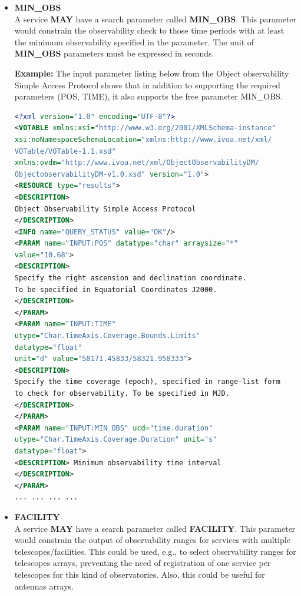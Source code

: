 \documentclass[11pt,a4paper]{ivoatex/ivoa}
\begin{document}
\begin{itemize}
\item{\textbf{MIN\_OBS}\\A service \textbf{MAY} have a search parameter
called \textbf{MIN\_OBS}. This parameter would constrain the observability
check to those time periods with at least the minimum observability specified
in the parameter. The unit of \textbf{MIN\_OBS} parameters must be expressed
in seconds.\par
\textbf{Example:} The input parameter listing below from the Object
observability Simple Access Protocol shows that in addition to supporting
the required parameters (POS, TIME), it also supports the free
parameter MIN\_OBS.
\begin{lstlisting}[language=XML]
<?xml version="1.0" encoding="UTF-8"?>
<VOTABLE xmlns:xsi="http://www.w3.org/2001/XMLSchema-instance"
xsi:noNamespaceSchemaLocation="xmlns:http://www.ivoa.net/xml/
VOTable/VOTable-1.1.xsd"
xmlns:ovdm="http://www.ivoa.net/xml/ObjectObservabilityDM/
ObjectobservabilityDM-v1.0.xsd" version="1.0">
<RESOURCE type="results">
<DESCRIPTION>
Object Observability Simple Access Protocol
</DESCRIPTION>
<INFO name="QUERY_STATUS" value="OK"/>
<PARAM name="INPUT:POS" datatype="char" arraysize="*"
value="10.68">
<DESCRIPTION>
Specify the right ascension and declination coordinate.
To be specified in Equatorial Coordinates J2000.
</DESCRIPTION>
</PARAM>
<PARAM name="INPUT:TIME"
utype="Char.TimeAxis.Coverage.Bounds.Limits"
datatype="float"
unit="d" value="58171.45833/58321.958333">
<DESCRIPTION>
Specify the time coverage (epoch), specified in range-list form
to check for observability. To be specified in MJD.
</DESCRIPTION>
</PARAM>
<PARAM name="INPUT:MIN_OBS" ucd="time.duration"
utype="Char.TimeAxis.Coverage.Duration" unit="s"
datatype="float">
<DESCRIPTION> Minimum observability time interval
</DESCRIPTION>
</PARAM>
... ... ... ...
\end{lstlisting}

}
\item{\textbf{FACILITY}\\A service \textbf{MAY} have a search parameter
called \textbf{FACILITY}. This parameter would constrain the output of
observability ranges for services with multiple telescopes/facilities.
This could be used, e.g., to select observability ranges for telescopes
arrays, preventing the need of registration of one service per telescopes
for this kind of observatories. Also, this could be useful for antennas
arrays.}
\end{itemize}
\end{document}
